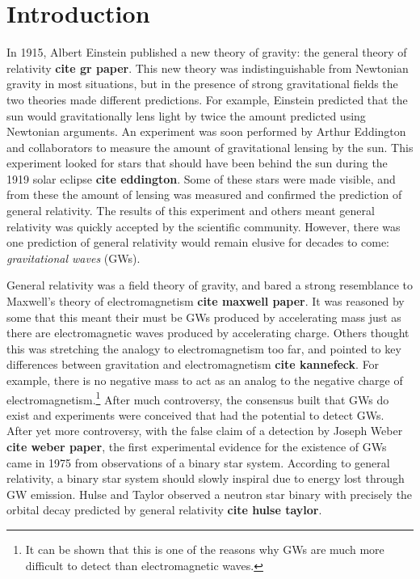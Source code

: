 \documentclass[11pt]{cuthesis}
\begin{document}
\chapter{Introduction}
In 1915, Albert Einstein published a new theory of gravity: the general theory of relativity \textbf{cite gr paper}. This new theory was indistinguishable from Newtonian gravity in most situations, but in the presence of strong gravitational fields the two theories made different predictions. For example, Einstein predicted that the sun would gravitationally lens light by twice the amount predicted using Newtonian arguments. An experiment was soon performed by Arthur Eddington and collaborators to measure the amount of gravitational lensing by the sun. This experiment looked for stars that should have been behind the sun during the 1919 solar eclipse \textbf{cite eddington}. Some of these stars were made visible, and from these the amount of lensing was measured and confirmed the prediction of general relativity. The results of this experiment and others meant general relativity was quickly accepted by the scientific community. However, there was one prediction of general relativity would remain elusive for decades to come: \textit{gravitational waves} (GWs). 

General relativity was a field theory of gravity, and bared a strong resemblance to Maxwell's theory of electromagnetism \textbf{cite maxwell paper}. It was reasoned by some that this meant their must be GWs produced by accelerating mass just as there are electromagnetic waves produced by accelerating charge. Others thought this was stretching the analogy to electromagnetism too far, and pointed to key differences between gravitation and electromagnetism \textbf{cite kannefeck}. For example, there is no negative mass to act as an analog to the negative charge of electromagnetism.\footnote{It can be shown that this is one of the reasons why GWs are much more difficult to detect than electromagnetic waves.} After much controversy, the consensus built that GWs do exist and experiments were conceived that had the potential to detect GWs. After yet more controversy, with the false claim of a detection by Joseph Weber \textbf{cite weber paper}, the first experimental evidence for the existence of GWs came in 1975 from observations of a binary star system. According to general relativity, a binary star system should slowly inspiral due to energy lost through GW emission. Hulse and Taylor observed a neutron star binary with precisely the orbital decay predicted by general relativity \textbf{cite hulse taylor}. 
\end{document}
